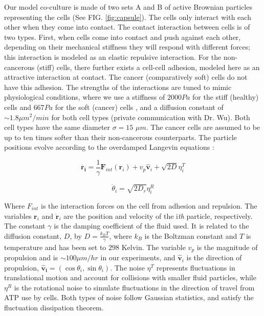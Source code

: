 \documentclass[aps,prb,twocolumn,groupedaddress,nofootinbib,floatfix]{revtex4}
\begin{document}
Our model co-culture is made of two sets A and B of active Brownian particles representing the cells (See FIG. \ref{fig:capsule}). 
The cells only interact with each other when they come into contact. The contact interaction between cells is of two types. First, when cells come into contact and push against each other,
depending on their mechanical stiffness they will respond with different forces; this interaction is modeled as an elastic repulsive interaction. For the non-cancerous (stiff) cells, there further exists
a cell-cell adhesion, modeled here as an attractive interaction at contact. The cancer (comparatively soft) cells do not have this adhesion.
The strengths of the interactions are tuned to mimic physiological conditions, where we use a stiffness of $2000 Pa$ for the stiff  (healthy) cells and $667 Pa$ for the soft (cancer) cells \cite{Lee},
and a diffusion constant of $\sim 1.8 \mu m^2 /min$ for both cell types (private communication with Dr. Wu).  Both cell types have the same diameter  $\sigma = 15$ $\mu m$.
The cancer cells are assumed to be up to ten times softer than their non-cancerous counterparts.  The particle positions evolve according to the overdamped 
Langevin equations \cite{Lemons,RednerBaskaran,FilyMarchetti,Butcher}: 

\begin{equation}
  \bm{\dot{\bm{r}_i}} = \frac{1}{\gamma}\bm{F}_{int}(\bm{r}_i) + v_p\hat{\bm{v}}_i+\sqrt{2D}\eta_i^T
\end{equation}

\begin{equation}
  \dot{\theta}_i=\sqrt{2D_r}\eta^R_i
\end{equation}

Where $F_{int}$ is the interaction forces on the cell from adhesion and repulsion.
The variables $\bm{r}_i$ and $\dot{\bm{r}}_i$ are the position and velocity of the i\textit{th} particle, respectively.
The constant $\gamma$ is the damping coefficient of the fluid used. It is related to the
diffusion constant, $D$, by $D=\frac{k_BT}{\gamma}$, where $k_B$ is the Boltzman constant and $T$ is temperature and has been set to $298$ Kelvin. 
The variable $v_p$ is the magnitude of propulsion and is $\sim 100 \mu m/hr$ in our experiments, and $\bm{\hat{v}}_i$ is the direction of propulsion, $\bm{\hat{v}_i}=(\cos \theta_i, \sin \theta_i)$.
The noise $\eta^T$ represents fluctuations in translational motion and account for collisions with smaller fluid particles, while
$\eta^R$ is the rotational noise to simulate fluctuations in the direction of travel from ATP use by cells. Both types of noise follow Gaussian statistics, and satisfy the fluctuation dissipation theorem.
\end{document}
